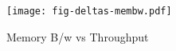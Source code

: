 \begin{figure}[t]
\texttt{[image: fig-deltas-membw.pdf]}
\caption{Memory B/w vs Throughput}
\label{fig:membw}
\end{figure}
